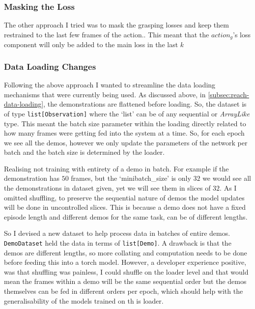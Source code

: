 \subsubsection{Masking the Loss}
The other approach I tried was to mask the grasping losses and keep them restrained to the last few frames of the action.. This meant that the $action_g$'s loss component will only be added to the main loss in the last $k$

\subsubsection{Data Loading Changes}
Following the above approach I wanted to streamline the data loading mechanisms that were currently being used. As discussed above, in \ref{subsec:reach-data-loading}, the demonstrations are flattened before loading. So, the dataset is of type \verb|list[Observation]| where the `list' can be of any sequential or \emph{ArrayLike} type. This meant the batch size parameter within the loading directly related to how many frames were getting fed into the system at a time. So, for each epoch we see all the demos, however we only update the parameters of the network per batch and the batch size is determined by the loader.

Realising not training with entirety of a demo in batch. For example if the demonstration has $50$ frames, but the `minibatch\_size' is only $32$ we would see all the demonstrations in dataset given, yet we will see them in slices of $32$. As I omitted shuffling, to preserve the sequential nature of demos the model updates will be done in uncontrolled slices. This is because a demo does not have a fixed episode length and different demos for the same task, can be of different lengths.

So I devised a new dataset to help process data in batches of entire demos. \verb|DemoDataset| held the data in terms of \verb|list[Demo]|. A drawback is that the demos are different lengths, so more collating and computation needs to be done before feeding this into a torch model. However, a developer experience positive, was that shuffling was painless, I could shuffle on the loader level and that would mean the frames within a demo will be the same sequential order but the demos themselves can be fed in different orders per epoch, which should help with the generalisability of the models trained on th is loader.


